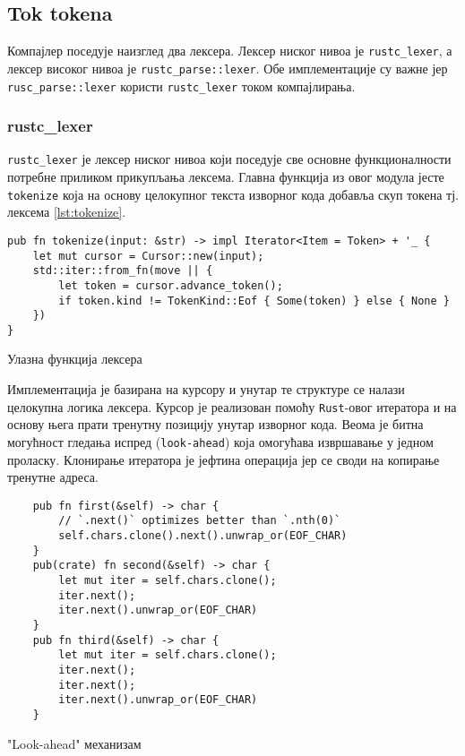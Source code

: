 \subsection{Tok tokena}

Компајлер поседује наизглед два лексера. Лексер ниског нивоа је \verb|rustc_lexer|, а лексер високог нивоа је \verb|rustc_parse::lexer|. 
Обе имплементације су важне јер \verb|rusc_parse::lexer| користи \verb|rustc_lexer| током компајлирања.

\subsubsection{rustc\_lexer}

\verb|rustc_lexer| је лексер ниског нивоа који поседује све основне
функционалности потребне приликом прикупљања лексема.
Главна функција из овог модула јесте \verb|tokenize| која на основу целокупног текста 
изворног кода добавља скуп токена тј. лексема \ref{lst:tokenize}.

\begin{listing}[H]
\begin{verbatim}
pub fn tokenize(input: &str) -> impl Iterator<Item = Token> + '_ {
    let mut cursor = Cursor::new(input);
    std::iter::from_fn(move || {
        let token = cursor.advance_token();
        if token.kind != TokenKind::Eof { Some(token) } else { None }
    })
}
\end{verbatim}
\caption{Улазна функција лексера}
\label{lst:tokenize}
\end{listing}

Имплементација је базирана на курсору и унутар те структуре се налази целокупна логика лексера. 
Курсор је реализован помоћу \verb|Rust|-овог итератора и на основу њега прати тренутну позицију 
унутар изворног кода. Веома је битна могућност гледања испред (\verb|look-ahead|) која омогућава 
извршавање у једном проласку.
Клонирање итератора је јефтина операција јер се своди на копирање тренутне адреса.

\begin{listing}[H]
\begin{verbatim}
    pub fn first(&self) -> char {
        // `.next()` optimizes better than `.nth(0)`
        self.chars.clone().next().unwrap_or(EOF_CHAR)
    }
    pub(crate) fn second(&self) -> char {
        let mut iter = self.chars.clone();
        iter.next();
        iter.next().unwrap_or(EOF_CHAR)
    }
    pub fn third(&self) -> char {
        let mut iter = self.chars.clone();
        iter.next();
        iter.next();
        iter.next().unwrap_or(EOF_CHAR)
    }
\end{verbatim}
\caption{"Look-ahead" механизам}
\end{listing}

